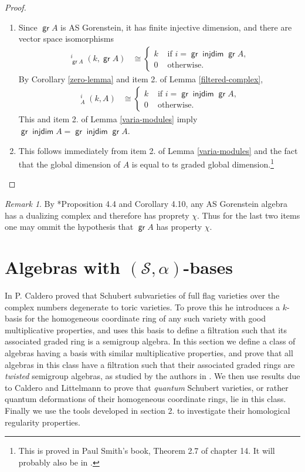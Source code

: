 \documentclass[11pt,fleqn]{article}
\theoremstyle{plain}
\theoremstyle{remark}
\newtheorem{Remark}[Theorem]{Remark}
\theoremstyle{definition}
\renewcommand\S{\mathcal S}
\DeclareMathOperator\GrExt{\underline{\mathsf{Ext}}}
\DeclareMathOperator\gr{\mathsf{gr}}
\DeclareMathOperator\injdim{\mathsf{injdim}}
\begin{document}
\begin{proof}
\begin{enumerate}
  \item Since $\gr A$ is AS Gorenstein, it has finite injective dimension, and there
  are vector space isomorphisms
  \begin{align*}
    \GrExt_{\gr A}^i(k,\gr A) &\cong
    \begin{cases} 
      k & \mbox{ if } i = \gr \injdim \gr A, \\ 0 & \mbox{ otherwise.}
    \end{cases}
  \end{align*}
  By Corollary \ref{zero-lemma} and item 2. of Lemma \ref{filtered-complex}, 
  \begin{align*}
    \GrExt_{A}^i(k,A) &\cong
    \begin{cases} 
      k & \mbox{ if } i = \gr \injdim \gr A, \\ 0 & \mbox{ otherwise.}
    \end{cases}
  \end{align*}
  This and item 2. of Lemma \ref{varia-modules} imply $\gr \injdim A = \gr \injdim
  \gr A$.

  \item This follows immediately from item 2. of Lemma \ref{varia-modules} and the fact
  that the global dimension of $A$ is equal to ts graded global dimension.\footnote{This
  is proved in Paul Smith's book, Theorem 2.7 of chapter 14. It will probably also be in
  \cite{RZ2}.}
  \end{enumerate}
\end{proof}

\begin{Remark}
	By \cite{Ye}*{Proposition 4.4 and Corollary 4.10}, any AS Gorenstein
	algebra has a dualizing complex and therefore has proprety $\chi$. Thus
	for the last two items one may ommit the hypothesis that $\gr A$ has
	property $\chi$.
\end{Remark}

\section{Algebras with $(\S,\alpha)$-bases}
In \cite{C} P. Caldero proved that Schubert subvarieties of full flag varieties over the
complex numbers degenerate to toric varieties. To prove this he introduces a $k$-basis
for the homogeneous coordinate ring of any such variety with good multiplicative
properties, and uses this basis to define a filtration such that its
associated graded ring is a semigroup algebra. In this section we define a class of
algebras having a basis with similar multiplicative properties,
and prove that all algebras in this class have a filtration such that their associated
graded rings are \emph{twisted} semigroup algebras, as studied by the authors in
\cite{RZ2}. We then use results due to Caldero \cite{C} and Littelmann \cite{Lit} to prove 
that \emph{quantum} Schubert
varieties, or rather quantum deformations of their homogeneous coordinate rings, lie in
this class. Finally we use the tools developed in section 2. to investigate their
homological regularity properties.
\end{document}
